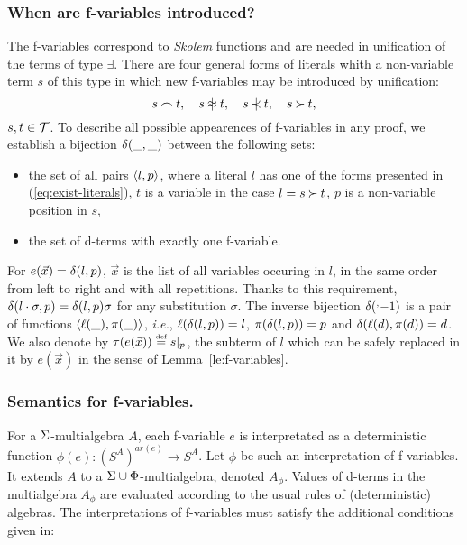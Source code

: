 \subsubsection{When are f-variables introduced?}
%
The f-variables correspond to {\em Skolem} functions and are needed in
unification of the terms of type $\exists$.  There are four general forms of
literals whith a non-variable term $s$ of this type in which new
f-variables may be introduced by unification:
\begin{equation} \label{eq:exist-literals}
 s\Int t,\quad s\notEq t, \quad s\notIncl t, \quad  s\Cont t,
\end{equation} 
\(s,t \in {\cal T}\).  To describe all possible appearences of f-variables
in any proof, we establish a bijection $\delta(\_,\_)$ between the following sets:
\begin{itemize}\smallerspaces
\item the set of all pairs \(\langle l,p\rangle\), where a literal $l$ has one of the
forms presented in (\ref {eq:exist-literals}), $t$ is
a variable in the case \(l= s\mathbin{\succ} t\), $p$ is a non-variable position
in $s$,
\item the set of d-terms with exactly one f-variable.
\end{itemize}
For \(e(\vec x)=\delta(l,p)\), \(\vec x\) is the list of all variables occuring in
$l$, in the same order from left to right and with all repetitions.  Thanks
to this requirement, \(\delta(l\cdot \sigma,p)=\delta(l,p)\sigma\) for any
substitution $\sigma$.  The inverse bijection $\expandafter\inverse\dt
\hide\_$ is a pair of functions \(\langle\ell(\_), \pi(\_)\rangle\), {\it i.e.}, \(\ell(\delta(l,p))=l\), \(\pi(\delta(l,p))=p\) and \(\delta(\ell(d),\pi(d))=d\).  We also denote by
$\tau(e(\vec x))\mathrel {\stackrel {\mbox {\tiny def}}{=}} s|_{p}$, the subterm of $l$ which can be safely
replaced in it by $e(\vec x)$ in the sense of Lemma~\ref {le:f-variables}.
%
\subsubsection{Semantics for f-variables.}
%
For a  \(\Sigma\)-multialgebra $A$, each f-variable $e$ is
interpretated as a deterministic function \(\phi(e): (S^A)^{ar(e)}\to S^A\).
Let $\phi$ be such an interpretation of f-variables. It
extends  $A$ to a \(\Sigma\cup\Phi\)-multialgebra, denoted
 \(A_\phi\).  Values of d-terms in the multialgebra \(A_\phi\) are
evaluated according to the usual rules of (deterministic) algebras.  
The interpretations of f-variables must satisfy the additional conditions
given in:


